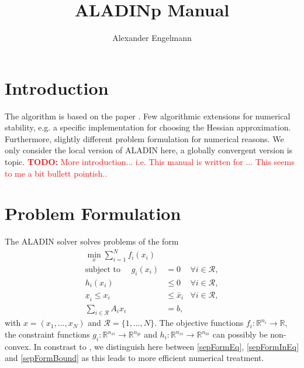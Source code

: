 \documentclass[]{scrartcl}
\title{ALADINp  Manual}
\author{Alexander Engelmann}
\begin{document}
\maketitle

\begin{abstract}

\end{abstract}

\tableofcontents

\section{Introduction}
The algorithm is based on the paper \cite{Houska}.
Few algorithmic extensions for numerical stability, e.g. a specific implementation for choosing the Hessian approximation.
Furthermore, slightly different problem formulation for numerical reasons.
We only consider the local version of ALADIN here, a globally convergent version is topic. \textcolor{red}{\textbf{TODO:} More introduction... i.e. This manual is written for ... This seems to me a bit bullett pointish..} 

\section{Problem Formulation}
The ALADIN solver solves problems of the form
\begin{subequations} \label{eq:sepForm}
	\begin{align} 
	\min_{x} \sum_{i=1}^N  f_i(x_i)& \\
	\text{subject to }\quad  g_i(x_i)&= 0 &\forall i \in \mathcal{R}, \label{sepFormEq} \\
	h_i(x_i)&\leq 0&\forall i \in \mathcal{R}, \label{sepFormInEq} \\
	\underline x_i \leq x_i& \leq \bar x_i &\forall i \in \mathcal{R}, \label{sepFormBound}\\
	\sum_{i\in \mathcal{R}} A_i x_i&=b \label{eq:consConstr},
	\end{align}
\end{subequations}
with $x=(x_1,\dots,x_N)$ and $\mathcal{R}=\{1,\dots,N\}$.
The objective functions $f_i:\mathbb{R}^{n_i}\rightarrow \mathbb{R}$, the constraint functions $g_i: \mathbb{R}^{n_{xi}} \rightarrow \mathbb{R}^{n_{gi}}$ and $h_i: \mathbb{R}^{n_{xi}} \rightarrow \mathbb{R}^{n_{hi}}$ can possibly be non-convex.
In constrast to \cite{Houska}, we distinguish here between \eqref{sepFormEq}, \eqref{sepFormInEq} and \eqref{sepFormBound} as this leads to more efficient numerical treatment.
\end{document}
